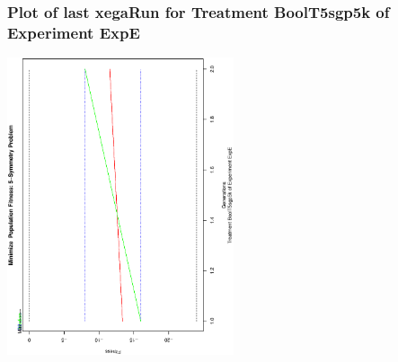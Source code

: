  \begin{frame}
 \frametitle{ Plot of last xegaRun for Treatment BoolT5sgp5k of Experiment ExpE }
 \begin{center}
\includegraphics[width=0.5\textwidth, angle=-90]
{ExpEPlotPopStatsFigure008.eps}
 \end{center}
 \label{report/ExpEPlotPopStatsFigure008.eps}  
 \end{frame}


